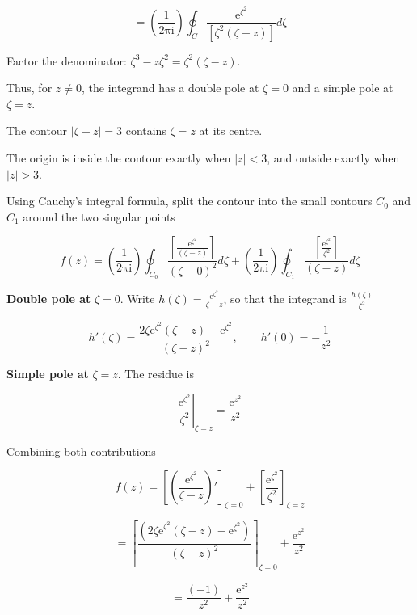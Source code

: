 \documentclass[11pt,a4paper]{article}
\theoremstyle{definition}
\theoremstyle{plain}
\begin{document}
\[
= \left(\frac{1}{2\mathrm{\pi}\mathrm{i}}\right)\oint_{C}\frac{\mathrm{e}^{\zeta^{2}}}{[\zeta^{2}(\zeta - z)]}d\zeta
\]

Factor the denominator: $\zeta^{3} - z\zeta^{2} = \zeta^{2}(\zeta - z)$.

Thus, for $z \ne 0$, the integrand has a double pole at $\zeta = 0$ and a simple pole at $\zeta = z$.

The contour $\vert{}\zeta - z\vert{} = 3$ contains $\zeta = z$ at its centre.

The origin is inside the contour exactly when $\vert{}z\vert{} < 3$, and outside exactly when $\vert{}z\vert{} > 3$.

Using Cauchy’s integral formula, split the contour into the small contours $C_{0}$ and $C_{1}$ around the two singular points

\begin{equation}
f(z) = \left(\frac{1}{2\mathrm{\pi}\mathrm{i}}\right)\oint_{C_{0}}\frac{[\frac{\mathrm{e}^{\zeta^{2}}}{(\zeta - z)}]}{(\zeta - 0)^{2}}d\zeta + \left(\frac{1}{2\mathrm{\pi}\mathrm{i}}\right)\oint_{C_{1}}\frac{[\frac{\mathrm{e}^{\zeta^{2}}}{\zeta^{2}}]}{(\zeta - z)}d\zeta
\end{equation}

\textbf{Double pole at} $\zeta = 0$. Write $h(\zeta) = \frac{\mathrm{e}^{\zeta^{2}}}{\zeta - z}$, so that the integrand is $\frac{h(\zeta)}{\zeta^{2}}$



\[
h'(\zeta) = \frac{2\zeta\mathrm{e}^{\zeta^{2}}(\zeta - z) - \mathrm{e}^{\zeta^{2}}}{(\zeta - z)^{2}}, \qquad h'(0) = -\frac{1}{z^{2}}
\]



\textbf{Simple pole at} $\zeta = z$. The residue is



\[
\left.\frac{\mathrm{e}^{\zeta^{2}}}{\zeta^{2}}\right|_{\zeta = z} = \frac{\mathrm{e}^{z^{2}}}{z^{2}}
\]



Combining both contributions

\[
f(z) = {\left[\left(\frac{\mathrm{e}^{\zeta^{2}}}{\zeta - z}\right)'\right]}_{\zeta = 0} + {\left[\frac{\mathrm{e}^{\zeta^{2}}}{\zeta^{2}}\right]}_{\zeta = z}
\]

\[
= {[\frac{({2\zeta \mathrm{e}}^{\zeta^{2}}(\zeta - z) - \mathrm{e}^{\zeta^{2}})}{(\zeta - z)^{2}}]}_{\zeta = 0} + \frac{\mathrm{e}^{z^{2}}}{z^{2}}
\]

\[
= \frac{(-1)}{z^{2}} + \frac{\mathrm{e}^{z^{2}}}{z^{2}}
\]
\end{document}
